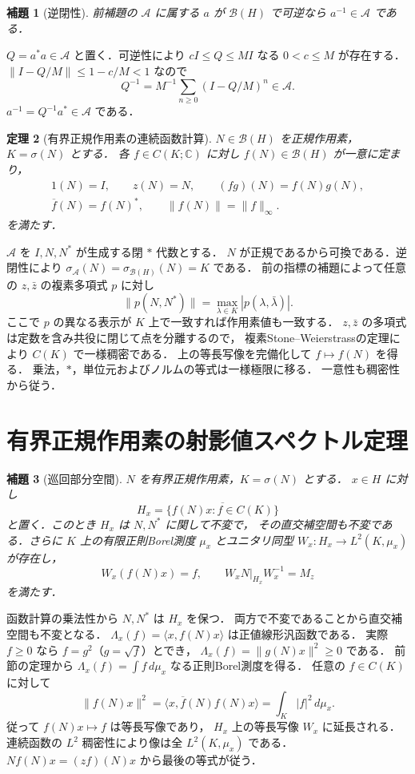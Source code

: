 \documentclass[a5paper,10pt,onecolumn]{jsarticle}
\makeatletter
\theoremstyle{mathnotetheorem}
\newtheorem{theorem}{定理}[section]
\newtheorem{lemma}[theorem]{補題}
\renewcommand{\proofname}{証明}
\renewenvironment{proof}[1][\proofname]{%
  \par\pushQED{\qed}\normalfont\topsep4\p@\@plus2\p@\relax
  \trivlist\item[\hskip\labelsep\bfseries #1]\ignorespaces
}{\popQED\endtrivlist\@endpefalse}
\newcommand{\norm}[1]{\lVert #1\rVert}
\makeatother
\begin{document}
\begin{lemma}[逆閉性]
前補題の $\mathcal A$ に属する $a$ が $\mathcal B(H)$ で可逆なら
$a^{-1}\in\mathcal A$ である．
\end{lemma}
\begin{proof}
$Q=a^*a\in\mathcal A$ と置く．可逆性により
$cI\le Q\le MI$ なる $0<c\le M$ が存在する．
$\norm{I-Q/M}\le1-c/M<1$ なので
\[
 Q^{-1}=M^{-1}\sum_{n\ge0}(I-Q/M)^n\in\mathcal A.
\]
$a^{-1}=Q^{-1}a^*\in\mathcal A$ である．
\end{proof}

\begin{theorem}[有界正規作用素の連続函数計算]
$N\in\mathcal B(H)$ を正規作用素，$K=\sigma(N)$ とする．
各 $f\in C(K;\mathbb C)$ に対し $f(N)\in\mathcal B(H)$ が一意に定まり，
\[
 \begin{gathered}
  1(N)=I,\qquad z(N)=N,\qquad
  (fg)(N)=f(N)g(N),\\
  \overline f(N)=f(N)^*,\qquad
  \norm{f(N)}=\norm f_\infty.
 \end{gathered}
\]
を満たす．
\end{theorem}
\begin{proof}
$\mathcal A$ を $I,N,N^*$ が生成する閉 $*$ 代数とする．
$N$ が正規であるから可換である．逆閉性により
$\sigma_{\mathcal A}(N)=\sigma_{\mathcal B(H)}(N)=K$ である．
前の指標の補題によって任意の $z,\bar z$ の複素多項式 $p$ に対し
\[
 \norm{p(N,N^*)}=\max_{\lambda\in K}|p(\lambda,\bar\lambda)|.
\]
ここで $p$ の異なる表示が $K$ 上で一致すれば作用素値も一致する．
$z,\bar z$ の多項式は定数を含み共役に閉じて点を分離するので，
複素Stone--Weierstrassの定理により $C(K)$ で一様稠密である．
上の等長写像を完備化して $f\mapsto f(N)$ を得る．
乗法，$*$，単位元およびノルムの等式は一様極限に移る．
一意性も稠密性から従う．
\end{proof}

\section{有界正規作用素の射影値スペクトル定理}
\begin{lemma}[巡回部分空間]
$N$ を有界正規作用素，$K=\sigma(N)$ とする．
$x\in H$ に対し
\[
 H_x=\overline{\{f(N)x:f\in C(K)\}}
\]
と置く．このとき $H_x$ は $N,N^*$ に関して不変で，
その直交補空間も不変である．さらに $K$ 上の有限正則Borel測度
$\mu_x$ とユニタリ同型
$W_x:H_x\to L^2(K,\mu_x)$ が存在し，
\[
 W_x(f(N)x)=f,\qquad W_xN|_{H_x}W_x^{-1}=M_z
\]
を満たす．
\end{lemma}
\begin{proof}
函数計算の乗法性から $N,N^*$ は $H_x$ を保つ．
両方で不変であることから直交補空間も不変となる．
$\Lambda_x(f)=\langle x,f(N)x\rangle$ は正値線形汎函数である．
実際 $f\ge0$ なら $f=g^2$（$g=\sqrt f$）とでき，
$\Lambda_x(f)=\norm{g(N)x}^2\ge0$ である．
前節の定理から
$\Lambda_x(f)=\int f\,d\mu_x$ なる正則Borel測度を得る．
任意の $f\in C(K)$ に対して
\[
 \norm{f(N)x}^2
 =\langle x,\overline f(N)f(N)x\rangle
 =\int_K|f|^2\,d\mu_x.
\]
従って $f(N)x\mapsto f$ は等長写像であり，
$H_x$ 上の等長写像 $W_x$ に延長される．
連続函数の $L^2$ 稠密性により像は全 $L^2(K,\mu_x)$ である．
$Nf(N)x=(zf)(N)x$ から最後の等式が従う．
\end{proof}
\end{document}
